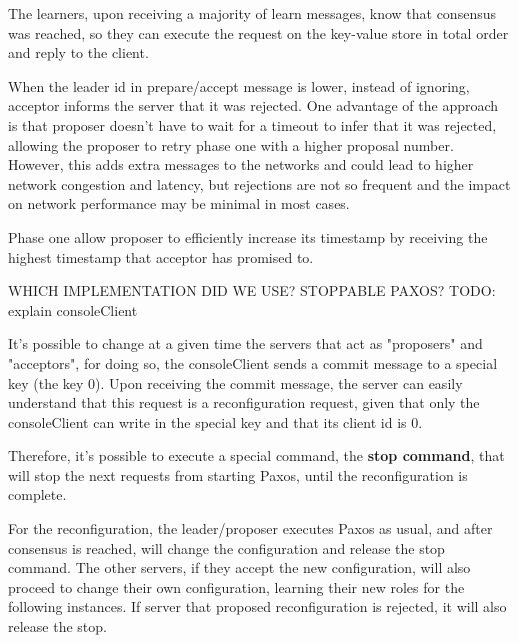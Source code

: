 \documentclass[times, 10pt,twocolumn]{article}
\begin{document}

The learners, upon receiving a majority of learn
messages, know that consensus was reached, so they can execute
the request on the key-value store in total order and reply to the client.


When the leader id in prepare/accept message is lower, instead of
ignoring, acceptor informs the server that it was rejected.
One advantage of the approach is that proposer doesn't have to wait
for a timeout to infer that it was rejected, allowing the proposer
to retry phase one with a higher proposal number.
However, this adds extra messages to the networks and could lead to
higher network congestion and latency, but rejections are not
so frequent and the impact on network performance may be minimal in most cases.

Phase one allow proposer to efficiently increase its timestamp by
receiving the highest timestamp that acceptor has promised to.


WHICH IMPLEMENTATION DID WE USE? STOPPABLE PAXOS?
TODO: explain consoleClient

It's possible to change at a given time the servers that act as "proposers"
and "acceptors", for doing so, the consoleClient sends a commit message to a
special key (the key 0). Upon receiving the commit message, the server can easily
understand that this request is a reconfiguration request, given that only the
consoleClient can write in the special key and that its client id is 0.

Therefore, it's possible to execute a special command, the \textbf{stop command},
that will stop the next requests from starting Paxos, until the reconfiguration
is complete.

For the reconfiguration, the leader/proposer executes Paxos as usual, and after
consensus is reached, will change the configuration and release the stop 
command. The other servers, if they accept the new configuration, will also
proceed to change their own configuration, learning their new roles for the
following instances. If server that proposed reconfiguration is rejected,
it will also release the stop.

\end{document}
